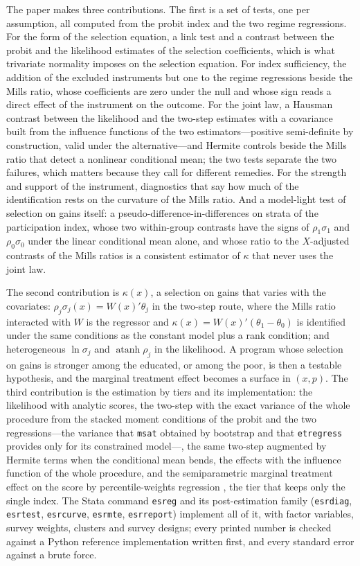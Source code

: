 \documentclass[11pt,a4paper]{article}
\theoremstyle{plain}
\theoremstyle{definition}
\theoremstyle{remark}
\newcommand{\1}{\mathbf{1}}
\newcommand{\cmd}[1]{\texttt{#1}}
\begin{document}
The paper makes three contributions. The first is a set of tests, one
per assumption, all computed from the probit index and the two regime
regressions. For the form of the selection equation, a link test and
a contrast between the probit and the likelihood estimates of the
selection coefficients, which is what trivariate normality imposes on
the selection equation. For index sufficiency, the addition of the
excluded instruments but one to the regime regressions beside the Mills
ratio, whose coefficients are zero under the null and whose sign reads
a direct effect of the instrument on the outcome. For the joint law, a
Hausman contrast between the likelihood and the two-step estimates with
a covariance built from the influence functions of the two
estimators---positive semi-definite by construction, valid under the
alternative---and Hermite controls beside the Mills ratio that detect a
nonlinear conditional mean; the two tests separate the two failures,
which matters because they call for different remedies. For the
strength and support of the instrument, diagnostics that say how much of
the identification rests on the curvature of the Mills ratio. And a
model-light test of selection on gains itself: a
pseudo-difference-in-differences on strata of the participation index,
whose two within-group contrasts have the signs of $\rho_1\sigma_1$
and $\rho_0\sigma_0$ under the linear conditional mean alone, and
whose ratio to the $X$-adjusted contrasts of the Mills ratios is a
consistent estimator of $\kappa$ that never uses the joint law.

The second contribution is $\kappa(x)$, a selection on gains that
varies with the covariates: $\rho_j\sigma_j(x)=W(x)'\theta_j$ in the
two-step route, where the Mills ratio interacted with $W$ is the
regressor and $\kappa(x)=W(x)'(\theta_1-\theta_0)$ is identified under
the same conditions as the constant model plus a rank condition; and
heterogeneous $\ln\sigma_j$ and $\operatorname{atanh}\rho_j$ in the
likelihood. A program whose selection on gains is stronger among the
educated, or among the poor, is then a testable hypothesis, and the
marginal treatment effect becomes a surface in $(x,p)$. The third
contribution is the estimation by tiers and its implementation: the
likelihood with analytic scores, the two-step with the exact variance
of the whole procedure from the stacked moment conditions of the probit
and the two regressions---the variance that \cmd{msat}
\citep{araar2026msat} obtained by bootstrap and that \cmd{etregress}
provides only for its constrained model---, the same two-step augmented
by Hermite terms when the conditional mean bends, the effects with the
influence function of the whole procedure, and the semiparametric
marginal treatment effect on the score by percentile-weights regression
\citep{araar2026pwr}, the tier that keeps only the single index. The
Stata command \cmd{esreg} and its post-estimation family
(\cmd{esrdiag}, \cmd{esrtest}, \cmd{esrcurve}, \cmd{esrmte},
\cmd{esrreport}) implement all of it, with factor variables, survey
weights, clusters and survey designs; every printed number is checked
against a Python reference implementation written first, and every
standard error against a brute force.
\end{document}
